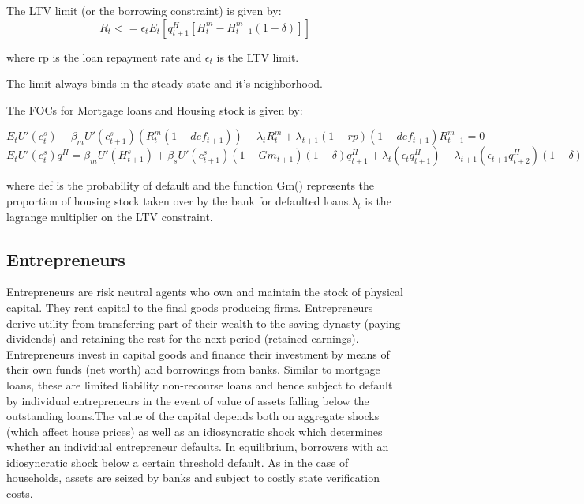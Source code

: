\documentclass[12pt]{article}
\numberwithin{equation}{section}
\begin{document}
\begin{appendix}
The LTV limit (or the borrowing constraint) is given by:
\begin{equation}
[B^m_{t}-(1-rp)B^m_{t-1}]R_{t} <=\epsilon_{t} E_t[q^H_{t+1} [H^m_t-H^m_{t-1}(1-\delta)]]
\end{equation}

where rp is the loan repayment rate and $\epsilon_{t}$ is the LTV limit.

The limit always binds in the steady state and it's neighborhood.

The FOCs for Mortgage loans and Housing stock is given by:

\begin{equation}
E_t{U'(c^{s}_{t})-\beta_m U'(c^{s}_{t+1})(R^m_{t}(1-def_{t+1}))-\lambda_{t}R^m_{t}+\lambda_{t+1}(1-rp)(1-def_{t+1})R^m_{t+1}=0}
\end{equation}
\begin{equation}
E_t{U'(c^{s}_{t})q^H = \beta_m U'(H^{s}_{t+1}) + \beta_sU'(c^{s}_{t+1})(1-Gm_{t+1})(1-\delta)q^H_{t+1}+\lambda_{t}(\epsilon_{t} q^H_{t+1})-\lambda_{t+1}(\epsilon_{t+1} q^H_{t+2})(1-\delta)}
\end{equation}

where def is the probability of default and the function Gm() represents the proportion of housing stock taken over by the bank for defaulted loans.$\lambda_{t}$ is the lagrange multiplier on the LTV constraint.




\subsection*{Entrepreneurs}

Entrepreneurs are risk neutral agents who own and maintain the stock of physical capital. They rent  capital to the final goods producing firms. Entrepreneurs derive utility from transferring part of their wealth to the saving dynasty (paying dividends) and retaining the rest for the next period (retained earnings). Entrepreneurs invest in capital goods and finance their investment by means of their own funds (net worth) and borrowings from banks. Similar to mortgage loans, these are limited liability non-recourse loans and hence subject to default by individual entrepreneurs in the event of value of assets falling below the outstanding loans.The value of the capital depends both on aggregate shocks (which affect house prices) as well as an idiosyncratic shock which determines whether an individual entrepreneur defaults. In equilibrium, borrowers with an idiosyncratic shock below a certain threshold default.  As in the case of households, assets are seized by banks and subject to costly state verification costs. 


\end{appendix}
\end{document}
